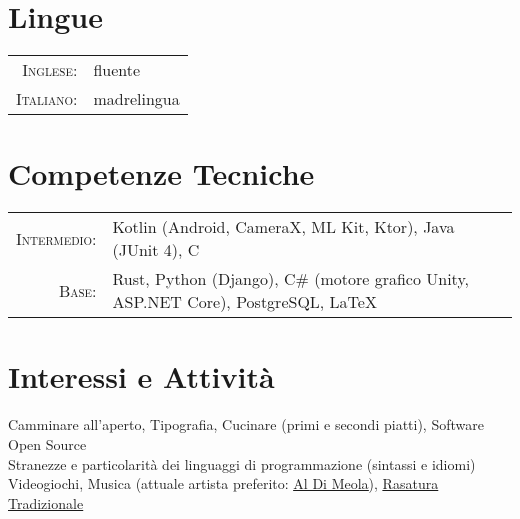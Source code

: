 \documentclass[a4paper,10pt]{article} %
\begin{document}

\section{Lingue}

\begin{tabular}{rl}
\textsc{Inglese:} & fluente\\
\textsc{Italiano:} & madrelingua\\
\end{tabular}


\section{Competenze Tecniche}

\begin{tabular}{rl}
\textsc{Intermedio:} & Kotlin \footnotesize(Android, CameraX, ML Kit, Ktor)\normalsize, Java \footnotesize(JUnit 4)\normalsize, C\\
\textsc{Base:} & Rust, Python \footnotesize(Django)\normalsize, C\# \footnotesize(motore grafico Unity, ASP.NET Core)\normalsize, PostgreSQL, {\sffamily\LaTeX}\setmainfont[SmallCapsFont=Fontin SmallCaps]{Fontin-Regular}\\

\end{tabular}


\section{Interessi e Attività}

Camminare all'aperto, Tipografia, Cucinare \footnotesize(primi e secondi piatti)\normalsize, Software Open Source\\
Stranezze e particolarità dei linguaggi di programmazione \footnotesize(sintassi e idiomi)\normalsize\\
Videogiochi, Musica \footnotesize(attuale artista preferito: \href{https://youtu.be/tsmThCBkBUo}{\underline{Al Di Meola}})\normalsize, \href{https://youtu.be/s0lyDViRbTY}{\underline{Rasatura Tradizionale}}

\end{document}
